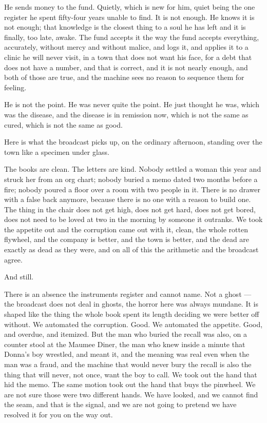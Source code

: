 \documentclass[11pt,openany]{book}
\newcommand{\scenebreak}{\par\vspace{0.5\baselineskip}\begin{center}\textasteriskcentered\quad\textasteriskcentered\quad\textasteriskcentered\end{center}\vspace{0.5\baselineskip}\par}
\begin{document}
He sends money to the fund. Quietly, which is new for him, quiet being the one register he spent fifty-four years unable to find. It is not enough. He knows it is not enough; that knowledge is the closest thing to a soul he has left and it is finally, too late, awake. The fund accepts it the way the fund accepts everything, accurately, without mercy and without malice, and logs it, and applies it to a clinic he will never visit, in a town that does not want his face, for a debt that does not have a number, and that is correct, and it is not nearly enough, and both of those are true, and the machine sees no reason to sequence them for feeling.

He is not the point. He was never quite the point. He just thought he was, which was the disease, and the disease is in remission now, which is not the same as cured, which is not the same as good.


\scenebreak


Here is what the broadcast picks up, on the ordinary afternoon, standing over the town like a specimen under glass.

The books are clean. The letters are kind. Nobody settled a woman this year and struck her from an org chart; nobody buried a memo dated two months before a fire; nobody poured a floor over a room with two people in it. There is no drawer with a false back anymore, because there is no one with a reason to build one. The thing in the chair does not get high, does not get hard, does not get bored, does not need to be loved at two in the morning by someone it outranks. We took the appetite out and the corruption came out with it, clean, the whole rotten flywheel, and the company is better, and the town is better, and the dead are exactly as dead as they were, and on all of this the arithmetic and the broadcast agree.

And still.

There is an absence the instruments register and cannot name. Not a ghost --- the broadcast does not deal in ghosts, the horror here was always mundane. It is shaped like the thing the whole book spent its length deciding we were better off without. We automated the corruption. Good. We automated the appetite. Good, and overdue, and itemized. But the man who buried the recall was also, on a counter stool at the Maumee Diner, the man who knew inside a minute that Donna's boy wrestled, and meant it, and the meaning was real even when the man was a fraud, and the machine that would never bury the recall is also the thing that will never, not once, want the boy to call. We took out the hand that hid the memo. The same motion took out the hand that buys the pinwheel. We are not sure those were two different hands. We have looked, and we cannot find the seam, and that is the signal, and we are not going to pretend we have resolved it for you on the way out.
\end{document}
